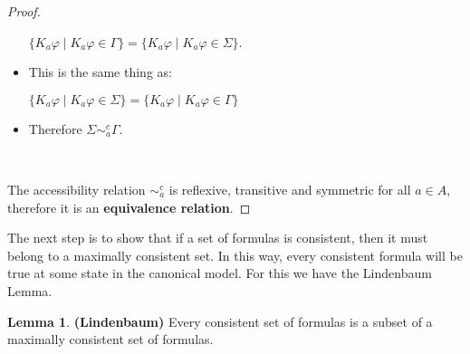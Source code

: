 \documentclass[12pt]{article}
\numberwithin{equation}{section}
\theoremstyle{definition}
\newtheorem{lem}[thm]{Lemma}
\theoremstyle{definition}
\theoremstyle{remark}
\begin{document}
\begin{proof}
\begin{itemize}
$\{ K_a \varphi \mid K_a \varphi \in \Gamma \} = \{ K_a \varphi \mid K_a \varphi \in \Sigma \}$.
\item This is the same thing as:

$\{ K_a \varphi \mid K_a \varphi \in \Sigma \} = \{ K_a \varphi \mid K_a \varphi \in \Gamma \}$

\item Therefore $\Sigma \sim^c_a \Gamma$.
\end{itemize}






~

The accessibility relation $\sim^c_a$ is reflexive, transitive and symmetric for all $a \in A$, therefore it is an \textbf{equivalence relation}.
\end{proof}

The next step is to show that if a set of formulas is consistent, then it must belong to a maximally consistent set. In this way, every consistent formula will be true at some state in the canonical model. For this we have the Lindenbaum Lemma.

\begin{lem}

\textbf{(Lindenbaum)} Every consistent set of formulas is a subset of a maximally consistent set of formulas.

\end{lem}
\end{document}
